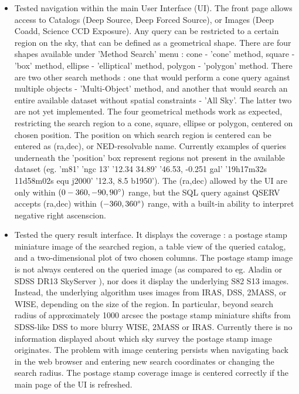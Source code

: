 \documentclass[fleqn,usenatbib, onecolumn]{mnras} %
\begin{document}
\begin{itemize}
	\item Tested navigation within the main User Interface (UI). The front page allows access to Catalogs (Deep Source, Deep Forced Source), or Images (Deep Coadd, Science CCD Exposure). Any query can be restricted to a certain region on the sky, that can be defined as a geometrical shape. There are four shapes available under  'Method Search' menu :  cone - 'cone' method,  square - 'box' method,  ellipse - 'elliptical' method, polygon - 'polygon' method.  There are two other search methods : one that would perform a cone query against multiple objects - 'Multi-Object' method, and  another  that would search an entire available dataset without spatial constraints  - 'All Sky'. The latter two are not yet implemented. The four geometrical methods work as expected, restricting the search region to a cone, square, ellipse or polygon, centered on chosen position.  The position on which search region is centered can be entered as (ra,dec), or NED-resolvable name. Currently examples of queries underneath the 'position' box represent regions not present in the available dataset (eg. 'm81' 'ngc 13' '12.34 34.89' '46.53, -0.251 gal'  '19h17m32s 11d58m02s equ j2000' '12.3, 8.5 b1950'). The (ra,dec) allowed by the UI are only within  $(0-360, -90,90 \degree)$ range, but the SQL query against QSERV  accepts (ra,dec) within $(-360,360 \degree)$ range, with a built-in ability to interpret negative right ascenscion.

	\item Tested the query result interface. It displays the coverage : a postage stamp miniature image of the searched region, a table view of the queried catalog, and a two-dimensional plot of two chosen columns. The postage  stamp image is not always centered on the queried image (as compared to eg. Aladin or SDSS DR13 SkyServer ), nor does it display the underlying S82 S13 images. Instead, the underlying algorithm uses images  from IRAS, DSS, 2MASS, or WISE, depending on the size of the region. In particular, beyond search radius of  approximately 1000 arcsec the postage stamp miniature shifts from SDSS-like DSS to more blurry WISE, 2MASS or IRAS.  Currently there is no information displayed about which sky survey the postage stamp image originates. The problem with image centering persists when navigating back in the web browser and entering new search coordinates or changing the search radius. The postage stamp coverage image is centered correctly if the main page of the UI is refreshed. 


\end{itemize}
\end{document}
